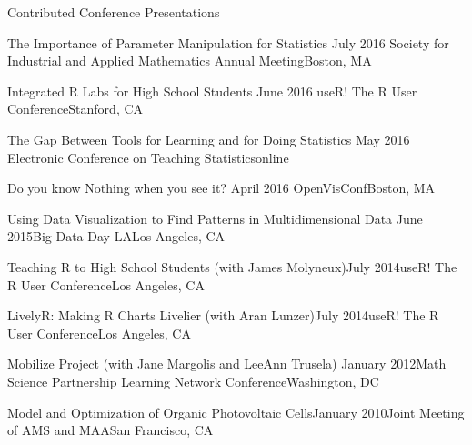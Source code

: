 \documentclass{resume} %
\begin{document}
\begin{rSection}{Contributed Conference Presentations}
\begin{sSubsection}{The Importance of Parameter Manipulation for Statistics}{ }{July 2016 }{Society for Industrial and Applied Mathematics Annual Meeting}{Boston, MA}
\end{sSubsection}

\begin{sSubsection}{Integrated R Labs for High School Students}{ }{June 2016 }{useR! The R User Conference}{Stanford, CA}
\end{sSubsection}

\begin{sSubsection}{The Gap Between Tools for Learning and for Doing Statistics}{ }{May 2016 }{Electronic Conference on Teaching Statistics}{online}
\end{sSubsection}

\begin{sSubsection}{Do you know Nothing when you see it?}{ }{April 2016 }{OpenVisConf}{Boston, MA}
\end{sSubsection}

\begin{sSubsection}{Using Data Visualization to Find Patterns in Multidimensional Data}{ }{June 2015}{Big Data Day LA}{Los Angeles, CA}
\end{sSubsection}


\begin{sSubsection}{Teaching R to High School Students}{ (with James Molyneux)}{July 2014}{useR! The R User Conference}{Los Angeles, CA}
\end{sSubsection}

\begin{sSubsection}{LivelyR: Making R Charts Livelier}{ (with Aran Lunzer)}{July 2014}{useR! The R User Conference}{Los Angeles, CA}
\end{sSubsection}

\begin{sSubsection}{Mobilize Project}{ (with Jane Margolis and LeeAnn Trusela)} {January 2012}{Math Science Partnership Learning Network Conference}{Washington, DC}
\end{sSubsection}

\begin{sSubsection}{Model and Optimization of Organic Photovoltaic Cells}{}{January 2010}{Joint Meeting of AMS and MAA}{San Francisco, CA}
\end{sSubsection}
\end{rSection}

\end{document}
